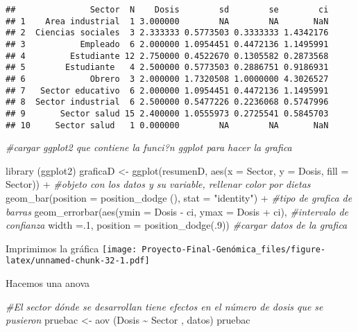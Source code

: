 \documentclass[
]{article}
\newenvironment{Shaded}{\begin{snugshade}}{\end{snugshade}}
\newcommand{\AttributeTok}[1]{\textcolor[rgb]{0.77,0.63,0.00}{#1}}
\newcommand{\CommentTok}[1]{\textcolor[rgb]{0.56,0.35,0.01}{\textit{#1}}}
\newcommand{\DecValTok}[1]{\textcolor[rgb]{0.00,0.00,0.81}{#1}}
\newcommand{\FunctionTok}[1]{\textcolor[rgb]{0.00,0.00,0.00}{#1}}
\newcommand{\NormalTok}[1]{#1}
\newcommand{\OtherTok}[1]{\textcolor[rgb]{0.56,0.35,0.01}{#1}}
\newcommand{\SpecialCharTok}[1]{\textcolor[rgb]{0.00,0.00,0.00}{#1}}
\newcommand{\StringTok}[1]{\textcolor[rgb]{0.31,0.60,0.02}{#1}}
\begin{document}
\begin{verbatim}
##               Sector  N    Dosis        sd        se        ci
## 1    Area industrial  1 3.000000        NA        NA       NaN
## 2  Ciencias sociales  3 2.333333 0.5773503 0.3333333 1.4342176
## 3           Empleado  6 2.000000 1.0954451 0.4472136 1.1495991
## 4         Estudiante 12 2.750000 0.4522670 0.1305582 0.2873568
## 5        Estudiante   4 2.500000 0.5773503 0.2886751 0.9186931
## 6             Obrero  3 2.000000 1.7320508 1.0000000 4.3026527
## 7   Sector educativo  6 2.000000 1.0954451 0.4472136 1.1495991
## 8  Sector industrial  6 2.500000 0.5477226 0.2236068 0.5747996
## 9       Sector salud 15 2.400000 1.0555973 0.2725541 0.5845703
## 10     Sector salud   1 0.000000        NA        NA       NaN
\end{verbatim}

\begin{Shaded}
\begin{Highlighting}[]
\CommentTok{\#cargar ggplot2 que contiene la funci?n ggplot para hacer la grafica}

\FunctionTok{library}\NormalTok{ (ggplot2) }
\NormalTok{graficaD }\OtherTok{\textless{}{-}} \FunctionTok{ggplot}\NormalTok{(resumenD, }\FunctionTok{aes}\NormalTok{(}\AttributeTok{x =}\NormalTok{ Sector, }\AttributeTok{y =}\NormalTok{ Dosis, }\AttributeTok{fill =}\NormalTok{ Sector)) }\SpecialCharTok{+} \CommentTok{\#objeto con los datos y su variable, rellenar color por dietas}
    \FunctionTok{geom\_bar}\NormalTok{(}\AttributeTok{position =} \FunctionTok{position\_dodge}\NormalTok{ (), }\AttributeTok{stat =} \StringTok{"identity"}\NormalTok{) }\SpecialCharTok{+} \CommentTok{\#tipo de grafica de barras}
    \FunctionTok{geom\_errorbar}\NormalTok{(}\FunctionTok{aes}\NormalTok{(}\AttributeTok{ymin =}\NormalTok{ Dosis }\SpecialCharTok{{-}}\NormalTok{ ci, }\AttributeTok{ymax =}\NormalTok{ Dosis }\SpecialCharTok{+}\NormalTok{ ci), }\CommentTok{\#intervalo de confianza}
                  \AttributeTok{width =}\NormalTok{.}\DecValTok{1}\NormalTok{, }
                  \AttributeTok{position =} \FunctionTok{position\_dodge}\NormalTok{(.}\DecValTok{9}\NormalTok{)) }\CommentTok{\#cargar datos de la grafica}
\end{Highlighting}
\end{Shaded}

Imprimimos la gráfica
\texttt{[image: Proyecto-Final-Genómica\_files/figure-latex/unnamed-chunk-32-1.pdf]}

Hacemos una anova

\begin{Shaded}
\begin{Highlighting}[]
\CommentTok{\#El sector dónde se desarrollan tiene efectos en el número de dosis que se pusieron}
\NormalTok{pruebac }\OtherTok{\textless{}{-}} \FunctionTok{aov}\NormalTok{ (Dosis }\SpecialCharTok{\textasciitilde{}}\NormalTok{ Sector , datos)}
\NormalTok{pruebac}
\end{Highlighting}
\end{Shaded}
\end{document}
